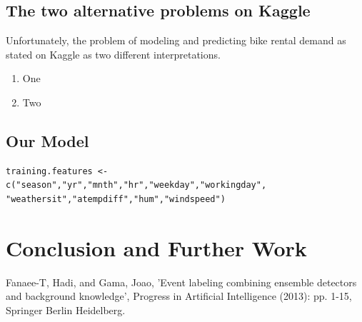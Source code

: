\documentclass[12pt]{article}
\begin{document}
\subsection{The two alternative problems on Kaggle}

Unfortunately, the problem of modeling and predicting bike rental demand as stated on Kaggle as two different interpretations.

\begin{enumerate}
	\item One
	\item Two
\end{enumerate}

\subsection{Our Model}

\begin{verbatim}
training.features <-  c("season","yr","mnth","hr","weekday","workingday",
"weathersit","atempdiff","hum","windspeed")
\end{verbatim}

\section{Conclusion and Further Work}
	\label{sec:conclusion}
	
	
	
\begin{thebibliography}{9}
		Fanaee-T, Hadi, and Gama, Joao, 'Event labeling combining ensemble detectors and background knowledge', Progress in Artificial Intelligence (2013): pp. 1-15, Springer Berlin Heidelberg.
	\end{thebibliography}
	
\end{document}
